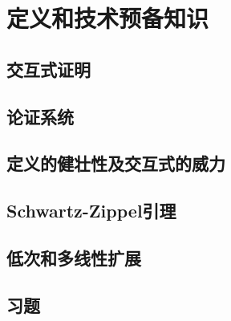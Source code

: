 \chapter{定义和技术预备知识}\label{chp:03Definition}
\section{交互式证明}\label{3.1}

\begin{definition}\label{def:3.1}
    
\end{definition}

\begin{definition}\label{def:3.2}
    
\end{definition}
\section{论证系统}\label{3.2}
\section{定义的健壮性及交互式的威力} \label{3.3}
\section{Schwartz-Zippel引理}\label{3.4}
\section{低次和多线性扩展}\label{3.5}
\section{习题}\label{3.6}
